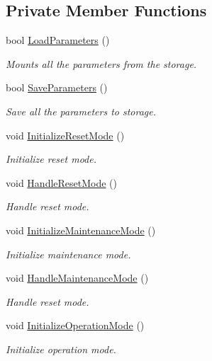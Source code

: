 \subsection*{Private Member Functions}
\begin{DoxyCompactItemize}
\item 
bool \hyperlink{classController_abcd6a66cbded25a29989e1af162d3a69}{Load\+Parameters} ()
\begin{DoxyCompactList}\small\item\em Mounts all the parameters from the storage. \end{DoxyCompactList}\item 
bool \hyperlink{classController_a718a2ae64edc1376a69d9dc08fa0ed44}{Save\+Parameters} ()
\begin{DoxyCompactList}\small\item\em Save all the parameters to storage. \end{DoxyCompactList}\item 
void \hyperlink{classController_a97450864deedc5aaba0380b52a716292}{Initialize\+Reset\+Mode} ()
\begin{DoxyCompactList}\small\item\em Initialize reset mode. \end{DoxyCompactList}\item 
void \hyperlink{classController_ae512c48c1ebafb35c90948835361cf0c}{Handle\+Reset\+Mode} ()
\begin{DoxyCompactList}\small\item\em Handle reset mode. \end{DoxyCompactList}\item 
void \hyperlink{classController_ae727ee9be8a2b2d0a966d1c14f85f360}{Initialize\+Maintenance\+Mode} ()
\begin{DoxyCompactList}\small\item\em Initialize maintenance mode. \end{DoxyCompactList}\item 
void \hyperlink{classController_a78080d5bfa37c5e783a630255846b721}{Handle\+Maintenance\+Mode} ()
\begin{DoxyCompactList}\small\item\em Handle reset mode. \end{DoxyCompactList}\item 
void \hyperlink{classController_a4f8fff93f7443154b80cd2d18316e32d}{Initialize\+Operation\+Mode} ()
\begin{DoxyCompactList}\small\item\em Initialize operation mode. \end{DoxyCompactList}\item 

\end{DoxyCompactItemize}
